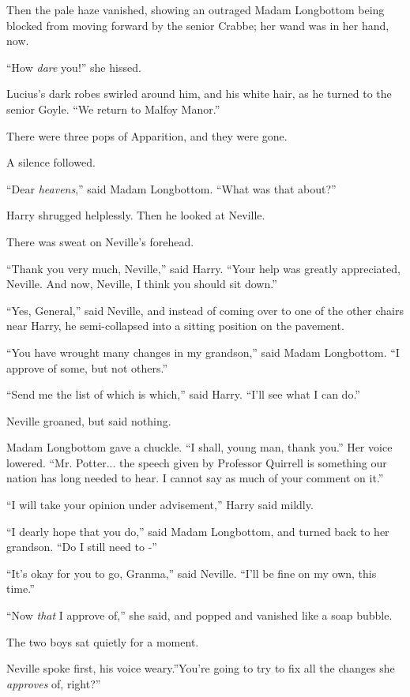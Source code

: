 Then the pale haze vanished, showing an outraged Madam Longbottom being
blocked from moving forward by the senior Crabbe; her wand was in her
hand, now.

``How \emph{dare} you!'' she hissed.

Lucius's dark robes swirled around him, and his white hair, as he turned
to the senior Goyle. ``We return to Malfoy Manor.''

There were three pops of Apparition, and they were gone.

A silence followed.

``Dear \emph{heavens},'' said Madam Longbottom. ``What was that about?''

Harry shrugged helplessly. Then he looked at Neville.

There was sweat on Neville's forehead.

``Thank you very much, Neville,'' said Harry. ``Your help was greatly
appreciated, Neville. And now, Neville, I think you should sit down.''

``Yes, General,'' said Neville, and instead of coming over to one of the
other chairs near Harry, he semi-collapsed into a sitting position on
the pavement.

``You have wrought many changes in my grandson,'' said Madam Longbottom.
``I approve of some, but not others.''

``Send me the list of which is which,'' said Harry. ``I'll see what I
can do.''

Neville groaned, but said nothing.

Madam Longbottom gave a chuckle. ``I shall, young man, thank you.'' Her
voice lowered. ``Mr. Potter... the speech given by Professor
Quirrell is something our nation has long needed to hear. I cannot say
as much of your comment on it.''

``I will take your opinion under advisement,'' Harry said mildly.

``I dearly hope that you do,'' said Madam Longbottom, and turned back to
her grandson. ``Do I still need to -''

``It's okay for you to go, Granma,'' said Neville. ``I'll be fine on my
own, this time.''

``Now \emph{that} I approve of,'' she said, and popped and vanished like
a soap bubble.

The two boys sat quietly for a moment.

Neville spoke first, his voice weary.''You're going to try to fix all
the changes she \emph{approves} of, right?''

